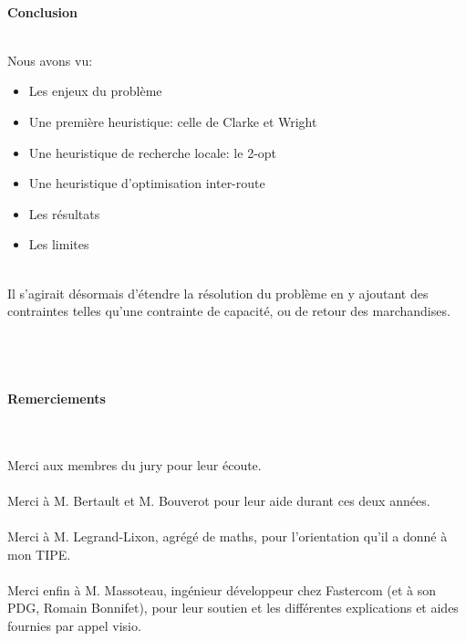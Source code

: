 \documentclass[10pt]{beamer}
\begin{document}
	\section*{\ }
	\subsection*{\ }

	\begin{frame}[plain]
		\begin{center}
			\Huge{\textbf{Conclusion}}
		\end{center}
		\  \\ Nous avons vu:
		\begin{itemize}[label=—]
			\item Les enjeux du problème \pause%
			\item Une première heuristique: celle de Clarke et Wright \pause%
			\item Une heuristique de recherche locale: le 2-opt \pause%
			\item Une heuristique d'optimisation inter-route \pause%
			\item Les résultats \pause%
			\item Les limites \pause%
		\end{itemize}
		\  \\
		Il s'agirait désormais d'étendre la résolution du problème en y ajoutant des contraintes telles qu'une contrainte de capacité, ou de retour des marchandises. 
	
	\end{frame}

	\subsection*{\ }

	\begin{frame}[plain]
		\begin{center}
			\Huge{\textbf{Remerciements}}
		\end{center}
		{\small
		\  \\ \  \\Merci aux membres du jury pour leur écoute.\\ \  \\
		Merci à M. Bertault et M. Bouverot pour leur aide durant ces deux années.\\ \  \\
		Merci à M. Legrand-Lixon, agrégé de maths, pour l'orientation qu'il a donné à mon TIPE.\\ \  \\
		Merci enfin à M. Massoteau, ingénieur développeur chez Fastercom (et à son PDG, Romain Bonnifet), pour leur soutien et les différentes explications et aides fournies par appel visio. 
		}
	\end{frame}
\end{document}
